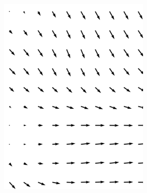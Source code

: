 \begin{figure} [H]
\begin{minipage}[w]{0.28\linewidth}
\includegraphics[width=1\linewidth, right]{pics/fields/vec.png} \\
\end{minipage}
\hfill
\begin{minipage}[w]{0.28\linewidth}

\end{minipage}
\end{figure}
